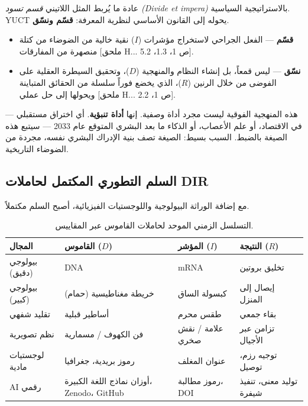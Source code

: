 \documentclass[12pt,a4paper]{article}
\begin{document}
	عادة ما يُربط المثل اللاتيني \emph{قسم تسود (Divide et impera)} بالاستراتيجية السياسية. YUCT يحوله إلى القانون الأساسي لنظرية المعرفة: \textbf{قسّم ونسّق}.
	
	\begin{itemize}[leftmargin=*]
		\item \textbf{قسّم} — الفعل الجراحي لاستخراج مؤشرات (\(I\)) نقية خالية من الضوضاء من كتلة منصهرة من المفارقات [ملحق H... ص 1، 1.3، 5.2].
		\item \textbf{نسّق} — ليس قمعاً، بل إنشاء النظام والمنهجية (\(D\))، وتحقيق السيطرة العقلية على الفوضى من خلال الرنين (\(R\))، الذي يخضع فوراً سلسلة من الحقائق المتباينة ويحولها إلى حل عملي [ملحق H... ص 1، 2.2].
	\end{itemize}
	
	هذه المنهجية الفوقية ليست مجرد أداة وصفية. إنها \textbf{أداة تنبؤية}. أي اختراق مستقبلي — في الاقتصاد، أو علم الأعصاب، أو الذكاء ما بعد البشري المتوقع عام 2033 — سيتبع هذه الصيغة بالضبط. السبب بسيط: الصيغة تصف بنية الإدراك البشري نفسه، مجردة من الضوضاء التاريخية.
	
	\subsection{السلم التطوري المكتمل لحاملات DIR}
	
	مع إضافة الوراثة البيولوجية واللوجستيات الفيزيائية، أصبح السلم مكتملاً.
	
	\begin{table}[htbp]
		\centering
		\caption{التسلسل الزمني الموحد لحاملات القاموس عبر المقاييس.}
		\label{tab:dir-ladder}
		\small
		\begin{tabular}{p{3cm}p{3.5cm}p{3.5cm}p{3cm}}
			\toprule
			\textbf{المجال} & \textbf{القاموس (\(D\))} & \textbf{المؤشر (\(I\))} & \textbf{النتيجة (\(R\))} \\
			\midrule
			بيولوجي (دقيق) & DNA & mRNA & تخليق بروتين \\
			بيولوجي (كبير) & خريطة مغناطيسية (حمام) & كبسولة الساق & إيصال إلى المنزل \\
			تقليد شفهي & أساطير قبلية & طقس محرم & بقاء جمعي \\
			نظم تصويرية & فن الكهوف / مسمارية & علامة / نقش صخري & تزامن عبر الأجيال \\
			لوجستيات مادية & رموز بريدية، جغرافيا & عنوان المغلف & توجيه رزم، توصيل \\
			AI رقمي & أوزان نماذج اللغة الكبيرة، Zenodo، GitHub & رموز مطالبة، DOI & توليد معنى، تنفيذ شيفرة \\
			\bottomrule
		\end{tabular}
	\end{table}
	
\end{document}
